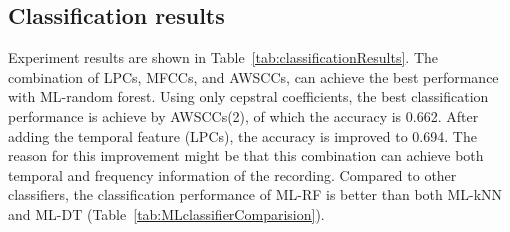 \subsection{Classification results}

Experiment results are shown in Table~\ref{tab:classificationResults}. The combination of LPCs, MFCCs, and AWSCCs, can achieve the best performance with ML-random forest. Using only cepstral coefficients, the best classification performance is achieve by AWSCCs(2), of which the accuracy is 0.662. After adding the temporal feature (LPCs), the accuracy is improved to 0.694. The reason for this improvement might be that this combination can achieve both temporal and frequency information of the recording. Compared to other classifiers, the classification performance of ML-RF is better than both ML-kNN and ML-DT (Table~\ref{tab:MLclassifierComparision}).



\begin{table}[htb!]
\centering
\caption{Comparison of different feature sets for ML classification. Here, MFCCs-1 and MFCCs-2 denote cepstral features are calculated via first and second methods, respectively}
\label{tab:classificationResults}
\end{table}




